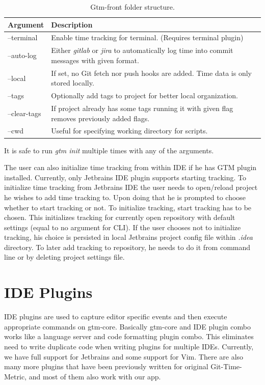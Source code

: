 \begin{table}[h]
    \centering
    \begin{tabular}{ | p{3cm} | p{10cm} |}
        \hline
        \textbf{Argument} & \textbf{Description}\\
        \hline
        --terminal & Enable time tracking for terminal. (Requires terminal plugin)\\
        \hline
        --auto-log & Either \textit{gitlab} or \textit{jira} to automatically log time
        into commit messages with given format.\\
        \hline
        --local & If set, no Git fetch nor push hooks are added.
        Time data is only stored locally.\\
        \hline
        --tags & Optionally add tags to project for better local organization.\\
        \hline
        --clear-tags & If project already has some tags running it with given flag removes previously added flags.\\
        \hline
        --cwd & Useful for specifying working directory for scripts.\\
        \hline
    \end{tabular}
    \caption{Gtm-front folder structure.}
    \label{tab:gtm-init}
\end{table}
It is safe to run \textit{gtm init} multiple times with any of the arguments.

The user can also initialize time tracking from within IDE if he has GTM plugin installed.
Currently, only Jetbrains IDE plugin supports starting tracking.
To initialize time tracking from Jetbrains IDE the user needs to open/reload project he wishes to add time tracking to.
Upon doing that he is prompted to choose whether to start tracking or not.
To initialize tracking, start tracking has to be chosen.
This initializes tracking for currently open repository with default settings (equal to no argument for CLI).
If the user chooses not to initialize tracking, his choice is persisted in local Jetbrains project config file within \textit{.idea} directory.
To later add tracking to repository, he needs to do it from command line or by deleting project settings file.


\section{IDE Plugins}\label{sec:plugins}

IDE plugins are used to capture editor specific events and then execute appropriate commands on gtm-core.
Basically gtm-core and IDE plugin combo works like a language server and code formatting plugin combo.
This eliminates need to write duplicate code when writing plugins for multiple IDEs.
Currently, we have full support for Jetbrains and some support for Vim.
There are also many more plugins that have been previously written for original Git-Time-Metric, and most of them also work with our app.

